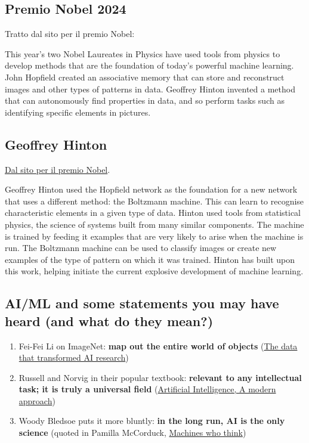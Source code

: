\documentclass[%
oneside,                 %
final,                   %
10pt]{article}
\begin{document}
\subsection{Premio Nobel 2024}

Tratto dal sito per il premio Nobel:
\begin{block}{}
This year’s two Nobel Laureates in Physics have used tools from
physics to develop methods that are the foundation of today’s powerful
machine learning. John Hopfield created an associative memory that can
store and reconstruct images and other types of patterns in
data. Geoffrey Hinton invented a method that can autonomously find
properties in data, and so perform tasks such as identifying specific
elements in pictures.
\end{block}

\subsection{Geoffrey Hinton}

\href{{https://www.nobelprize.org/prizes/physics/2024/press-release/#:~:text=Geoffrey%20Hinton%20invented%20a%20method,learning%20using%20artificial%20neural%20networks}}{Dal sito per il premio Nobel}.
\begin{block}{}
Geoffrey Hinton used the Hopfield network as the foundation for a new
network that uses a different method: the Boltzmann machine. This can
learn to recognise characteristic elements in a given type of
data. Hinton used tools from statistical physics, the science of
systems built from many similar components. The machine is trained by
feeding it examples that are very likely to arise when the machine is
run. The Boltzmann machine can be used to classify images or create
new examples of the type of pattern on which it was trained. Hinton
has built upon this work, helping initiate the current explosive
development of machine learning.
\end{block}

\subsection{AI/ML and some statements you may have heard (and what do they mean?)}

\begin{enumerate}
\item Fei-Fei Li on ImageNet: \textbf{map out the entire world of objects} (\href{{https://cacm.acm.org/news/219702-the-data-that-transformed-ai-research-and-possibly-the-world/fulltext}}{The data that transformed AI research})

\item Russell and Norvig in their popular textbook: \textbf{relevant to any intellectual task; it is truly a universal field} (\href{{http://aima.cs.berkeley.edu/}}{Artificial Intelligence, A modern approach})

\item Woody Bledsoe puts it more bluntly: \textbf{in the long run, AI is the only science} (quoted in Pamilla McCorduck, \href{{https://www.pamelamccorduck.com/machines-who-think}}{Machines who think})
\end{enumerate}
\end{document}
